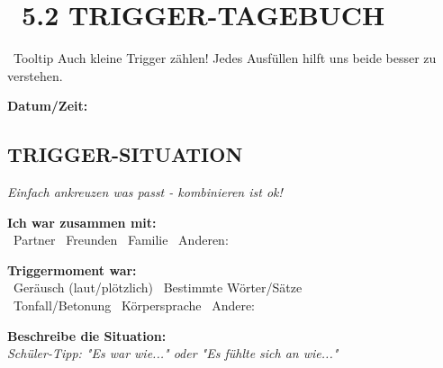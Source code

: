 
\newpage
\section*{\faBolt~5.2 TRIGGER-TAGEBUCH}

\begin{ctmmYellowBox}{\faLightbulb~Tooltip}
Auch kleine Trigger zählen! Jedes Ausfüllen hilft uns beide besser zu verstehen.
\end{ctmmYellowBox}

\textbf{Datum/Zeit:} \ctmmTextField{8cm}

\subsection*{TRIGGER-SITUATION}
\textit{Einfach ankreuzen was passt - kombinieren ist ok!}

\textbf{Ich war zusammen mit:} \\
\checkbox~Partner \quad \checkbox~Freunden \quad \checkbox~Familie \quad \checkbox~Anderen: \ctmmTextField{3cm}

\textbf{Triggermoment war:} \\
\checkbox~Geräusch (laut/plötzlich) \quad \checkbox~Bestimmte Wörter/Sätze \\
\checkbox~Tonfall/Betonung \quad \checkbox~Körpersprache \quad \checkbox~Andere: \ctmmTextField{3cm}

\textbf{Beschreibe die Situation:} \\
\textit{Schüler-Tipp: "Es war wie..." oder "Es fühlte sich an wie..."} \\
\ctmmTextField{12cm} \\
\ctmmTextField{12cm}

